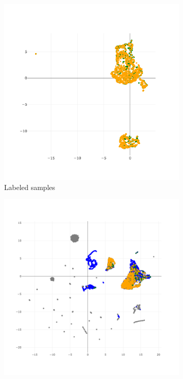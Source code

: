 \documentclass{article}
\begin{document}
\begin{figure}
    \centering
    \begin{subfigure}{.32\textwidth}
        \centering
        \includegraphics[width=\linewidth]{img/embedding_labeled.png}
        \caption{Labeled samples}
        \label{fig:alg-labeled}
    \end{subfigure}
    \begin{subfigure}{.32\textwidth}
        \centering
        \includegraphics[width=\linewidth]{img/embedding_similar_labeled.png}

\end{subfigure}
\end{figure}
\end{document}
